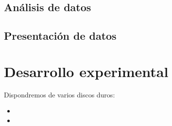 \documentclass[a4paper,10pt]{article}
\begin{document}
 \subsection{Análisis de datos}
 
 \subsection{Presentación de datos}
 
 
 \section{Desarrollo experimental}




Dispondremos de varios discos duros:
\begin{itemize}
 \item %
 \item %
\end{itemize}





\newpage

\newpage
\printbibliography
\end{document}

